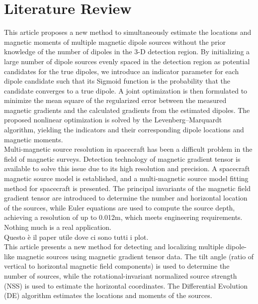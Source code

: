\chapter{Literature Review}

\cite{DetectionMultiplMagnetiDipoleSources} 
This article proposes a new method to simultaneously estimate the locations and magnetic 
moments of multiple magnetic dipole sources without the prior knowledge of the number of 
dipoles in the 3-D detection region. By initializing a large number of dipole sources 
evenly spaced in the detection region as potential candidates for the true dipoles, we 
introduce an indicator parameter for each dipole candidate such that its Sigmoid function 
is the probability that the candidate converges to a true dipole. A joint optimization is 
then formulated to minimize the mean square of the regularized error between the measured 
magnetic gradients and the calculated gradients from the estimated dipoles. The proposed 
nonlinear optimization is solved by the Levenberg–Marquardt algorithm, yielding the 
indicators and their corresponding dipole locations and magnetic moments. \\
 
\cite{multiple_in_spacecraft} 
Multi-magnetic source resolution in spacecraft has been a difficult problem in the field 
of magnetic surveys. Detection technology of magnetic gradient tensor is available to 
solve this issue due to its high resolution and precision. A spacecraft magnetic source 
model is established, and a multi-magnetic source model fitting method for spacecraft is 
presented. The principal invariants of the magnetic field gradient tensor are introduced 
to determine the number and horizontal location of the sources, while Euler equations are 
used to compute the source depth, achieving a resolution of up to 0.012m, which meets 
engineering requirements. \\

\cite{real_application} 
Nothing much is a real application. \\

\cite{multiple_plots} 
Questo è il paper utile dove ci sono tutti i plot. \\

\cite{multiple_DE_NSS_big_matrix} 
This article presents a new method for detecting and localizing multiple dipole-like 
magnetic sources using magnetic gradient tensor data. The tilt angle (ratio of vertical 
to horizontal magnetic field components) is used to determine the number of sources, 
while the rotational-invariant normalized source strength (NSS) is used to estimate the 
horizontal coordinates. The Differential Evolution (DE) algorithm estimates the 
locations and moments of the sources. \\

